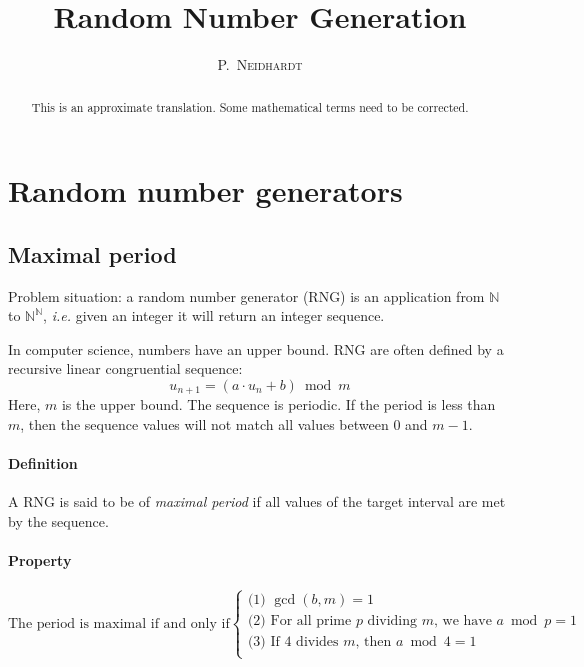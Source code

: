 \documentclass[10pt,a4paper]{article}
\title{Random Number Generation}
\author{\textsc{P.~Neidhardt}}
\def\ie{\textsl{i.e.}\xspace}
\def\N{\mathbb{N}}
\begin{document}
\maketitle
\vfill
\thispagestyle{empty}

\begin{abstract}
  This is an approximate translation. Some mathematical terms need to be
  corrected.
\end{abstract}


\section{Random number generators}

\subsection{Maximal period}

Problem situation: a random number generator (RNG) is an application from $\N$
to $\N^\N$, \ie{} given an integer it will return an integer sequence.

In computer science, numbers have an upper bound. RNG are often defined by a
recursive linear congruential sequence:
\[
u_{n+1} = (a \cdot u_n + b) \bmod m
\]
Here, $m$ is the upper bound. The sequence is periodic.
If the period is less than $m$, then the sequence values will not match all
values between $0$ and $m-1$.


\paragraph{Definition}
A RNG is said to be of \emph{maximal period} if all values of the target
interval are met by the sequence.

\paragraph{Property}

\[
\text{The period is maximal if and only if}
\left\{
  \begin{array}{l}
    \text{(1) } \gcd(b,m) = 1 \\
    \text{(2) } \text{For all prime $p$ dividing $m$, we have } a \bmod p = 1 \\
    \text{(3) } \text{If 4 divides $m$, then } a \bmod 4 = 1 \\
  \end{array}
\right.
\]
\end{document}
